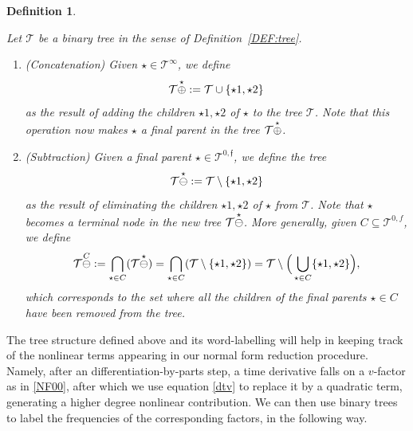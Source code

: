 \documentclass[a4paper,
11pt,  reqno]{amsart}
\makeatletter
\newcommand{\5}{\textup{V}}
\newtheorem{definition}[theorem]{Definition}
\theoremstyle{remark}
\newcommand{\TT}{\mathcal{T}}
\newcommand{\ff}{\mathfrak{f}}
\def\<#1>{\csname MH@symb@#1\endcsname}
\numberwithin{equation}{section}
\numberwithin{theorem}{section}
\makeatother
\begin{document}
\begin{definition}
\label{DEF:tree3}
\rm

Let $\TT$ be a binary tree in the sense of Definition~\ref{DEF:tree}.


\begin{enumerate}




\smallskip
\item[(i)] (Concatenation)
Given $ \star \in \TT^\infty$, we define
$$
\TT \overset{\star}{\oplus} \<1>
: = \TT \cup \{\star1, \star2\}
$$
as the result of adding the children $\star1,\star2$ of $\star$ to the tree $\TT$.
Note that this operation now makes $\star$ a final parent in the tree $\TT \overset{\star}{\oplus} \<1>$.




\smallskip
\item[(ii)] (Subtraction)
Given a final parent $\star  \in \TT^{0,\ff}$, we define the tree
$$
\TT \overset{\star }{\ominus } \<1>
: = \TT \setminus \{ \star1, \star2  \}
$$
as the result of eliminating the children $\star1, \star2$ of $\star$
from $\TT$. Note that $\star$ becomes a terminal node in the new tree $\TT \overset{\star}{\ominus } \<1>$.
More generally, given $C\subseteq \TT^{0,f}$, we define
\begin{align}
\label{treeSubtr}
\TT \overset{C}{\ominus} \<1> : =
 \bigcap_{\star \in C} ( \TT \overset{\star}{\ominus}  \<1>)
= \bigcap_{\star\in C} (\TT \setminus \{\star1,\star2\})
= \TT \setminus \Big( \bigcup_{\star\in C} \{\star1,\star2\} \Big),
\end{align}
which corresponds to the set where all the children of the final parents $\star\in C$ have been removed from the tree.


\end{enumerate}



\end{definition}



The tree structure defined above and its word-labelling will help in keeping track of the nonlinear terms appearing in our normal form reduction procedure. Namely, after an differentiation-by-parts step, a time derivative falls on a $v$-factor as in \eqref{NF00}, after which we use equation \eqref{dtv} to replace it by a quadratic term, generating a higher degree nonlinear contribution. We can then use binary trees to label the frequencies of the corresponding factors, in the following way.
\end{document}
